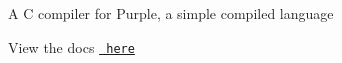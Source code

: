 A C compiler for Purple, a simple compiled language

View the docs \href{https://charlesaverill.github.io/Purple/doc/html/index.html}{\texttt{ here}} 